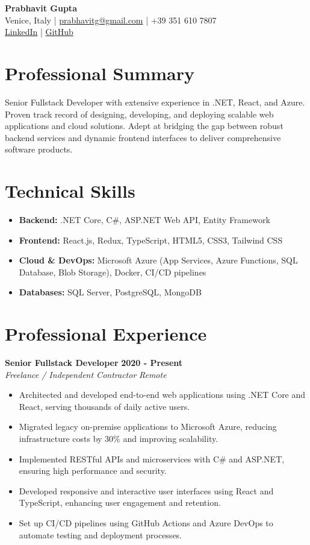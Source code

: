 \documentclass[10pt,a4paper]{article}
\begin{document}
\begin{center}
    {\LARGE \textbf{Prabhavit Gupta}} \\
    \vspace{2mm}
    Venice, Italy | \href{mailto:prabhavitg@gmail.com}{prabhavitg@gmail.com} | +39 351 610 7807 \\
    \href{https://www.linkedin.com/in/prabhavit/}{LinkedIn} | \href{https://github.com/prab-gupta}{GitHub}
\end{center}

\vspace{4mm}
\section*{Professional Summary}
Senior Fullstack Developer with extensive experience in .NET, React, and Azure. Proven track record of designing, developing, and deploying scalable web applications and cloud solutions. Adept at bridging the gap between robust backend services and dynamic frontend interfaces to deliver comprehensive software products.

\section*{Technical Skills}
\begin{itemize}
    \item \textbf{Backend:} .NET Core, C\#, ASP.NET Web API, Entity Framework
    \item \textbf{Frontend:} React.js, Redux, TypeScript, HTML5, CSS3, Tailwind CSS
    \item \textbf{Cloud \& DevOps:} Microsoft Azure (App Services, Azure Functions, SQL Database, Blob Storage), Docker, CI/CD pipelines
    \item \textbf{Databases:} SQL Server, PostgreSQL, MongoDB
\end{itemize}

\section*{Professional Experience}
\textbf{Senior Fullstack Developer} \hfill \textbf{2020 - Present} \\
\textit{Freelance / Independent Contractor} \hfill \textit{Remote}
\begin{itemize}
    \item Architected and developed end-to-end web applications using .NET Core and React, serving thousands of daily active users.
    \item Migrated legacy on-premise applications to Microsoft Azure, reducing infrastructure costs by 30\% and improving scalability.
    \item Implemented RESTful APIs and microservices with C\# and ASP.NET, ensuring high performance and security.
    \item Developed responsive and interactive user interfaces using React and TypeScript, enhancing user engagement and retention.
    \item Set up CI/CD pipelines using GitHub Actions and Azure DevOps to automate testing and deployment processes.
\end{itemize}
\end{document}
